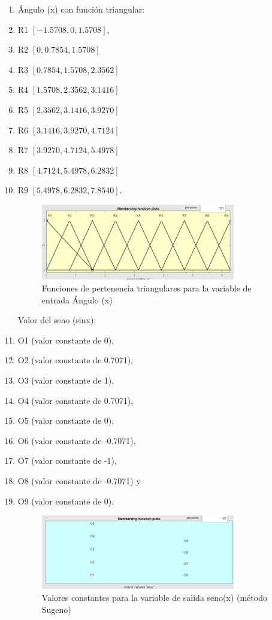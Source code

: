 \documentclass[11pt, letterpaper]{article}
\begin{document}
\begin{enumerate}
	
	 \item Ángulo (x) con función triangular: 
	
	\item R1 $[-1.5708, 0, 1.5708]$, 
	\item R2 $[0, 0.7854, 1.5708]$ 
	\item R3 $[0.7854, 1.5708, 2.3562]$
	\item R4 $[1.5708, 2.3562, 3.1416]$
	\item R5 $[2.3562, 3.1416, 3.9270]$
	\item R6 $[3.1416, 3.9270, 4.7124]$
	\item R7 $[3.9270, 4.7124, 5.4978]$
	\item R8 $[4.7124, 5.4978, 6.2832]$
	\item R9 $[5.4978, 6.2832, 7.8540]$.

	\begin{figure}[h]
		\centering
		\includegraphics[width=0.8\textwidth]{IMG/P11.png}
		\caption{Funciones de pertenencia triangulares para la variable de entrada Ángulo (x)}
	\end{figure}

	\newpage

	 Valor del seno (sinx): 
	\item O1 (valor constante de 0), 
	\item O2 (valor constante de 0.7071),
	\item O3 (valor constante de 1), 
	\item O4 (valor constante de 0.7071), 
	\item O5 (valor constante de 0), 
	\item O6 (valor constante de -0.7071), 
	\item O7 (valor constante de -1), 
	\item O8 (valor constante de -0.7071) y 
	\item O9 (valor constante de 0).
	\begin{figure}[h]
		\centering
		\includegraphics[width=0.8\textwidth]{IMG/P12.png}
		\caption{Valores constantes para la variable de salida seno(x) (método Sugeno)}
	\end{figure}
\end{enumerate}
\end{document}
